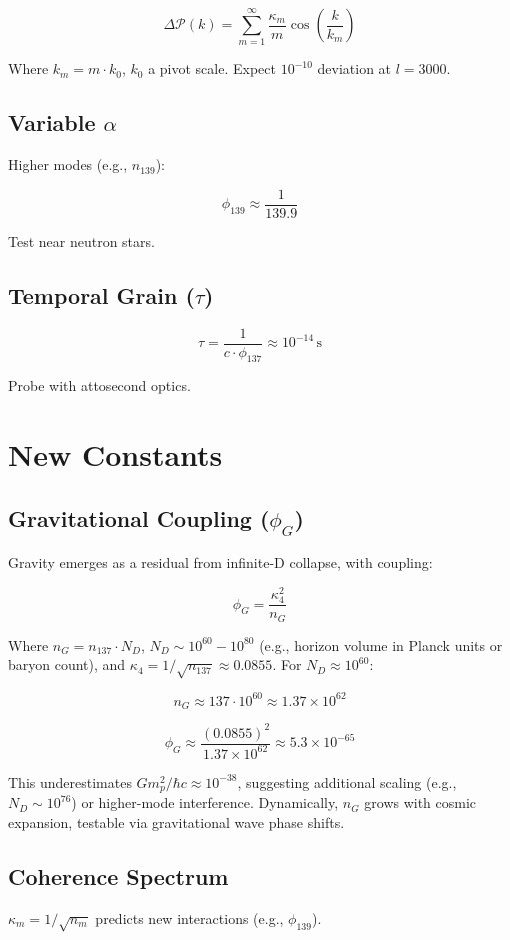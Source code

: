 \documentclass[12pt]{article}
\begin{document}
\[
\Delta \mathcal{P}(k) = \sum_{m=1}^\infty \frac{\kappa_m}{m} \cos\left(\frac{k}{k_m}\right)
\]

Where \(k_m = m \cdot k_0\), \(k_0\) a pivot scale. Expect \(10^{-10}\) deviation at \(l = 3000\).

\subsection{Variable \(\alpha\)}
Higher modes (e.g., \(n_{139}\)):

\[
\phi_{139} \approx \frac{1}{139.9}
\]

Test near neutron stars.

\subsection{Temporal Grain (\(\tau\))}
\[
\tau = \frac{1}{c \cdot \phi_{137}} \approx 10^{-14} \, \text{s}
\]

Probe with attosecond optics.

\section{New Constants}

\subsection{Gravitational Coupling (\(\phi_G\))}
Gravity emerges as a residual from infinite-D collapse, with coupling:

\[
\phi_G = \frac{\kappa_4^2}{n_G}
\]

Where \(n_G = n_{137} \cdot N_D\), \(N_D \sim 10^{60} - 10^{80}\) (e.g., horizon volume in Planck units or baryon count), and \(\kappa_4 = 1/\sqrt{n_{137}} \approx 0.0855\). For \(N_D \approx 10^{60}\):

\[
n_G \approx 137 \cdot 10^{60} \approx 1.37 \times 10^{62}
\]

\[
\phi_G \approx \frac{(0.0855)^2}{1.37 \times 10^{62}} \approx 5.3 \times 10^{-65}
\]

This underestimates \(G m_p^2 / \hbar c \approx 10^{-38}\), suggesting additional scaling (e.g., \(N_D \sim 10^{76}\)) or higher-mode interference. Dynamically, \(n_G\) grows with cosmic expansion, testable via gravitational wave phase shifts.

\subsection{Coherence Spectrum}
\(\kappa_m = 1/\sqrt{n_m}\) predicts new interactions (e.g., \(\phi_{139}\)).
\end{document}
